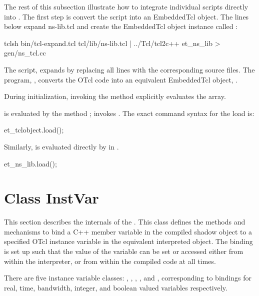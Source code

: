 The rest of this subsection illustrate
how to integrate individual scripts directly into \ns.
The first step is convert the script into an EmbeddedTcl object.
The lines below expand ns-lib.tcl and create the EmbeddedTcl object
instance called :
\begin{program}
        tclsh bin/tcl-expand.tcl tcl/lib/ns-lib.tcl | \bs
                               ../Tcl/tcl2c++ et_ns_lib > gen/ns_tcl.cc
\end{program}
The script, 
expands  by replacing all  lines
with the corresponding source files.
The program, ,
converts the OTcl code into an equivalent EmbeddedTcl object, .

During initialization, invoking the method 
explicitly evaluates the array.
\begin{list}{---}{}
\item
  is evaluated by the method
  ;
  invokes .
  The exact command syntax for the load is:
  \begin{program}
	et_tclobject.load();
  \end{program}
\item
  Similarly,
  is evaluated directly by  in .
  \begin{program}
	et_ns_lib.load();
  \end{program}
\end{list}

\section{Class InstVar}
\label{sec:InstVar}

This section describes the internals of the .
This class defines the methods and mechanisms to bind
a C++ member variable in the compiled shadow object
to a specified OTcl instance variable in the equivalent interpreted object.
The binding is set up such that the value of the variable can be
set or accessed either from within the interpreter, or from
within the compiled code at all times.

There are five instance variable classes:
,
,
,
,
and ,
corresponding to bindings for real, time, bandwidth, integer, and
boolean valued variables respectively.

